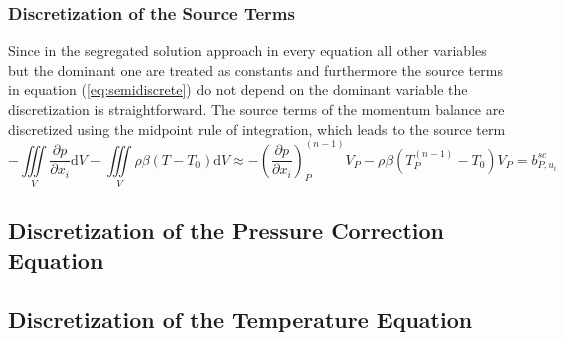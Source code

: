       \subsubsection{Discretization of the Source Terms}

      Since in the segregated solution approach in every equation all other variables but the dominant one are treated as constants and furthermore the source terms in equation (\ref{eq:semidiscrete}) do not depend on the dominant variable the discretization is straightforward. The source terms of the momentum balance are discretized using the midpoint rule of integration, which leads to the source term
      \begin{equation}
        - \iiint\limits_V \frac{\partial p}{\partial x_i} \mathrm{d}V
        - \iiint\limits_V \rho \beta \left(T - T_0\right) \mathrm{d}V
        \approx
        - \left(\frac{\partial p}{\partial x_i}\right)_P^{(n-1)} V_P
        - \rho \beta \left(T_P^{(n-1)} - T_0\right) V_P
        = b_{P,u_i}^{sc}
      \end{equation}

  \subsection{Discretization of the Pressure Correction Equation}

  \subsection{Discretization of the Temperature Equation}

